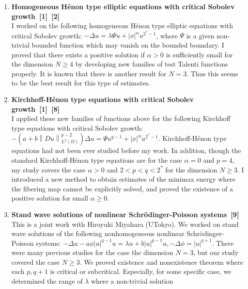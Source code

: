
\begin{enumerate}
  \item {\bf Homogeneous H\'enon type elliptic equations with critical Sobolev growth~[1]~[2]} \\
  I worked on the following
  homogeneous H\'enon type elliptic equations with critical Sobolev growth:
  $- \Delta u = \lambda \Psi u + \lvert x \rvert^\alpha u^{2^*-1}$,
  where
  $\Psi$ is a given non-trivial bounded function which may vanish on the bounded boundary. I proved that there exists a positive solution if $\alpha > 0$ is sufficiently small for the dimension $N \geq 4$ by developing new families of test Talenti functions properly. It is known that there is another result for $N = 3$. Thus this seems to be the best result for this type of estimates.
  \item {\bf Kirchhoff-H\'enon type equations with critical Sobolev growth~[1]~[8]} \\
  I applied these new families of functions above for the following Kirchhoff type equations with critical Sobolev growth:
  $- \left( a + b \left\| Du \right\|^{p-2}_{L^2(\Omega)} \right) \Delta u = \Psi u^{q-1} + \lvert x \rvert^\alpha u^{2^* - 1}$.
  Kirchhoff-H\'enon type equations had not been ever studied before my work. In addition, though the standard Kirchhoff-H\'enon type equations are for the case $\alpha = 0$ and $p = 4$, my study covers the case $\alpha > 0$ and $2 < p < q < 2^*$ for the dimension $N \geq 3$. I introduced a new method to obtain estimates of the minimax energy where the fibering map cannot be explicitly solved, and proved the existence of a positive solution for small $\alpha \geq 0$.
  \item {\bf Stand wave solutions of
  nonlinear Schr\"{o}dinger-Poisson systems~[9]} \\
  This is a joint work with Hiroyuki Miyahara (UTokyo).
  We worked on stand wave solutions
  of the following nonhomogeneous
  nonlinear Schr\"{o}dinger-Poisson systems:
  $-\Delta u -a \phi \left\lvert u \right\rvert^{q-1} u = \lambda u
  + b \left\lvert u \right\rvert^{p-1} u, -\Delta \phi =
  \left\lvert u \right\rvert^{q+1}$.
  There were many previous studies for the case the dimension $N = 3$,
  but our study covered the case $N \geq 3$.
  We proved existence and nonexistence theorem
  where each $p, q+1$ is critical or subcritical.
  Especially, for some specific case,
  we determined the range of $\lambda$ where a non-trivial solution

\end{enumerate}
